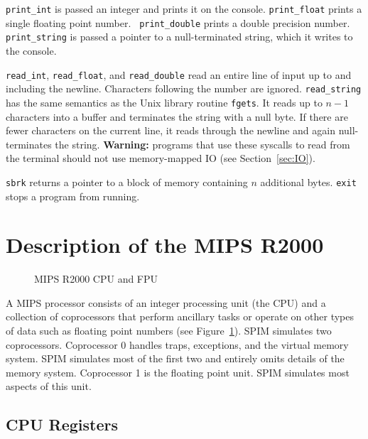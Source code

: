\documentclass[11pt]{article}
\begin{document}
{\tt print\_int} is passed an integer and prints it on the console.
{\tt print\_float} prints a single floating point number. {\tt
print\_double} prints a double precision number.  {\tt print\_string}
is passed a pointer to a null-terminated string, which it writes to
the console.

{\tt read\_int}, {\tt read\_float}, and {\tt read\_double} read an
entire line of input up to and including the newline.  Characters
following the number are ignored.  {\tt read\_string} has the same
semantics as the Unix library routine {\tt fgets}.  It reads up to
$n-1$ characters into a buffer and terminates the string with a null
byte.  If there are fewer characters on the current line, it reads
through the newline and again null-terminates the string.  {\bf
Warning:} programs that use these syscalls to read from the terminal
should not use memory-mapped IO (see Section~\ref{sec:IO}).

{\tt sbrk} returns a pointer to a block of memory containing $n$
additional bytes.  {\tt exit} stops a program from running.

\section{Description of the MIPS R2000}
\label{sec:mips}

\begin{figure}
  \centerline{}
  \caption{MIPS R2000 CPU and FPU}
  \label{fig:mips}
\end{figure}
A MIPS processor consists of an integer processing unit (the CPU) and
a collection of coprocessors that perform ancillary tasks or operate
on other types of data such as floating point numbers (see
Figure~\ref{fig:mips}).  SPIM simulates two coprocessors.  Coprocessor
0 handles traps, exceptions, and the virtual memory system.  SPIM
simulates most of the first two and entirely omits details of the
memory system.  Coprocessor 1 is the floating point unit.  SPIM
simulates most aspects of this unit.

\subsection{CPU Registers}
\end{document}
